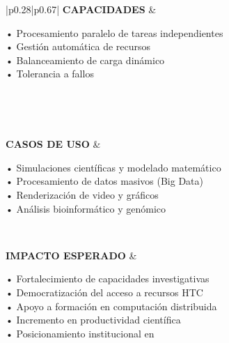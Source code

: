 \begin{table}[H]
\begin{tabular}{|p{0.28\textwidth}|p{0.67\textwidth}|}
		\textbf{CAPACIDADES}               &
		\begin{minipage}[t]{\linewidth}
			\vspace{2pt}
			• Procesamiento paralelo de tareas independientes \\
			• Gestión automática de recursos \\
			• Balanceamiento de carga dinámico \\
			• Tolerancia a fallos
			\vspace{2pt}
		\end{minipage}                                                                                                                                                                                                                             \\ \hline

		                                                                                                                                                                                                    \\ \hline

		\textbf{CASOS DE USO}              &
		\begin{minipage}[t]{\linewidth}
			\vspace{2pt}
			• Simulaciones científicas y modelado matemático \\
			• Procesamiento de datos masivos (Big Data) \\
			• Renderización de video y gráficos \\
			• Análisis bioinformático y genómico \\
			\vspace{2pt}
		\end{minipage}                                                                                                                                                                                                                              \\ \hline

		\textbf{IMPACTO ESPERADO}          &
		\begin{minipage}[t]{\linewidth}
			\vspace{2pt}
			• Fortalecimiento de capacidades investigativas \\
			• Democratización del acceso a recursos HTC \\
			• Apoyo a formación en computación distribuida \\
			• Incremento en productividad científica \\
			• Posicionamiento institucional en \HTC
			\vspace{2pt}
		\end{minipage}                                                                                                                                                                                                                               \\ \hline


\end{tabular}
\end{table}
